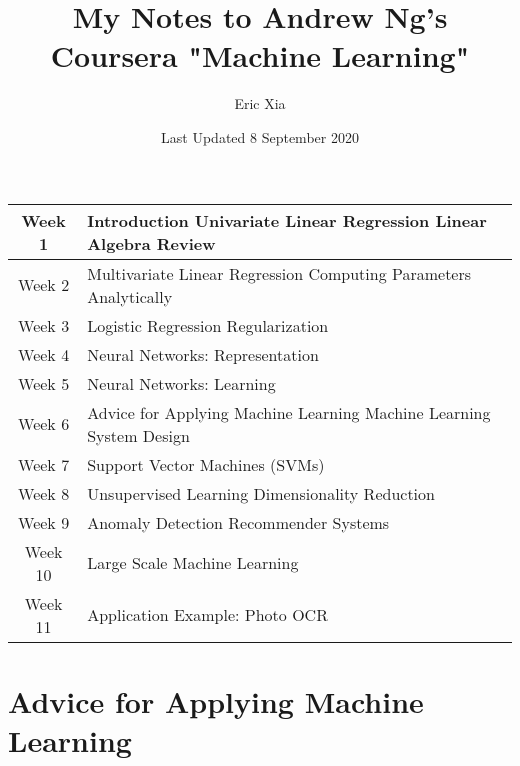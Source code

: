 \documentclass{article}
\title{My Notes to Andrew Ng's Coursera "Machine Learning"}
\author{Eric Xia}
\date{Last Updated 8 September 2020}
\begin{document}
    \maketitle
    \tableofcontents

    \begin{center}
        \begin{tabular}{|c|p{60mm}|}
            \hline
            Week 1 & Introduction \newline Univariate Linear Regression \newline Linear Algebra Review \\
            \hline
            Week 2 & Multivariate Linear Regression \newline Computing Parameters Analytically \\
            \hline
            Week 3 & Logistic Regression \newline Regularization \\
            \hline
            Week 4 & Neural Networks: Representation \\
            \hline
            Week 5 & Neural Networks: Learning \\
            \hline
            Week 6 & Advice for Applying Machine Learning \newline Machine Learning System Design \\
            \hline
            Week 7 & Support Vector Machines (SVMs) \\
            \hline
            Week 8 & Unsupervised Learning \newline Dimensionality Reduction \\
            \hline
            Week 9 & Anomaly Detection \newline Recommender Systems \\
            \hline
            Week 10 & Large Scale Machine Learning \\
            \hline
            Week 11 & Application Example: Photo OCR \\
            \hline
        \end{tabular}
    \end{center}

    
    

    \section{Advice for Applying Machine Learning}
\end{document}
